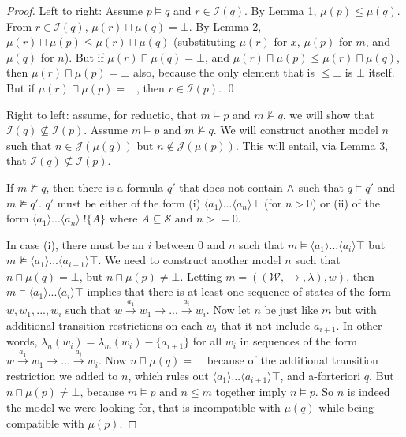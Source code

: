 \begin{proof}

Left to right: Assume $p \models q$ and $r \in \mathcal{I}(q)$.
By Lemma 1, $\mu(p) \leq \mu(q)$.
From $r \in \mathcal{I}(q)$, $\mu(r) \sqcap \mu(q) = \bot$.
By Lemma 2, $\mu(r) \sqcap \mu(p) \leq \mu(r) \sqcap \mu(q)$ (substituting $\mu(r)$ for $x$, $\mu(p)$ for $m$, and $\mu(q)$ for $n$).
But if $\mu(r) \sqcap \mu(q) = \bot$, and $\mu(r) \sqcap \mu(p) \leq \mu(r) \sqcap \mu(q)$, then $\mu(r) \sqcap \mu(p) = \bot$ also, because the only element that is $\leq \bot$ is $\bot$ itself.
But if $\mu(r) \sqcap \mu(p) = \bot$, then $r \in \mathcal{I}(p)$.
\qed

Right to left: assume, for reductio, that $m \models p$ and $m \nvDash q$. we will show that $\mathcal{I}(q) \nsubseteq \mathcal{I}(p)$. 
Assume $m \models p \mbox{ and } m \nvDash q$. We will construct another model $n$ such that $n \in \mathcal{J}(\mu(q))$ but $n \notin \mathcal{J}(\mu(p))$.
This will entail, via Lemma 3, that $\mathcal{I}(q) \nsubseteq \mathcal{I}(p)$.

If $m \nvDash q$, then there is a formula $q'$ that does not contain $\land$ such that $q \models q'$ and $m \nvDash q'$. $q'$ must be either of the form (i) $\langle a_1 \rangle ... \langle a_n \rangle \top$ (for $n > 0$) or (ii) of the form $\langle a_1 \rangle ... \langle a_n \rangle \; !\{A\}$ where $A \subseteq \mathcal{S} \mbox{ and } n >= 0$.

In case (i), there must be an $i$ between $0$ and $n$ such that $m \models \langle a_1 \rangle ... \langle a_i \rangle \top$ but $m \nvDash  \langle a_1 \rangle ... \langle a_{i+1} \rangle \top$. We need to construct another model $n$ such that $n \sqcap \mu(q) = \bot$, but $n \sqcap \mu(p) \neq \bot$. Letting $m = ((\mathcal{W},\rightarrow,\lambda),w)$, then $m \models \langle a_1 \rangle ... \langle a_i \rangle \top$ implies that there is at least one sequence of states of the form $w, w_1, ..., w_i$ such that $w \xrightarrow{a_1} w_1 \rightarrow ... \xrightarrow{a_i} w_i$. 
Now let $n$ be just like $m$ but with additional transition-restrictions on each $w_i$ that it not include $a_{i+1}$. 
In other words, $\lambda_n(w_i) = \lambda_m(w_i)  - \{a_{i+1}\}$ for all $w_i$ in sequences of the form $w \xrightarrow{a_1} w_1 \rightarrow ... \xrightarrow{a_i} w_i$. Now $n \sqcap \mu(q) = \bot$ because of the additional transition restriction we added to $n$, which rules out $\langle a_1 \rangle ... \langle a_{i+1} \rangle \top$, and a-forteriori $q$. But $n \sqcap \mu(p) \neq \bot$, because $m \models p$ and $n \leq m$ together imply $n \models p$. So $n$ is indeed the model we were looking for, that is incompatible with $\mu(q)$ while being compatible with $\mu(p)$.


\end{proof}
